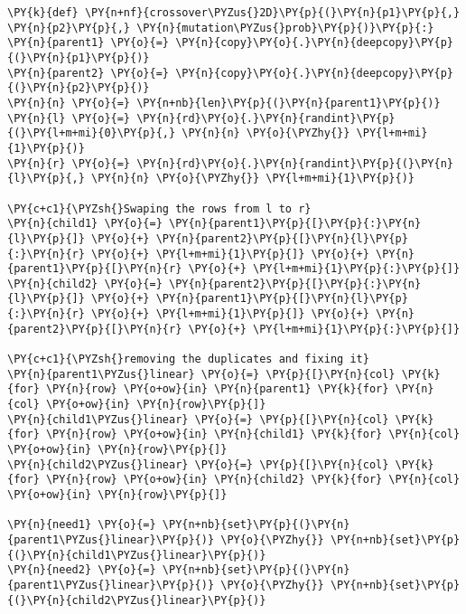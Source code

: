 \begin{tcolorbox}[breakable, size=fbox, boxrule=1pt, pad at break*=1mm,colback=cellbackground, colframe=cellborder]
\begin{Verbatim}[commandchars=\\\{\}]
\PY{k}{def} \PY{n+nf}{crossover\PYZus{}2D}\PY{p}{(}\PY{n}{p1}\PY{p}{,} \PY{n}{p2}\PY{p}{,} \PY{n}{mutation\PYZus{}prob}\PY{p}{)}\PY{p}{:}
\PY{n}{parent1} \PY{o}{=} \PY{n}{copy}\PY{o}{.}\PY{n}{deepcopy}\PY{p}{(}\PY{n}{p1}\PY{p}{)}
\PY{n}{parent2} \PY{o}{=} \PY{n}{copy}\PY{o}{.}\PY{n}{deepcopy}\PY{p}{(}\PY{n}{p2}\PY{p}{)}
\PY{n}{n} \PY{o}{=} \PY{n+nb}{len}\PY{p}{(}\PY{n}{parent1}\PY{p}{)}
\PY{n}{l} \PY{o}{=} \PY{n}{rd}\PY{o}{.}\PY{n}{randint}\PY{p}{(}\PY{l+m+mi}{0}\PY{p}{,} \PY{n}{n} \PY{o}{\PYZhy{}} \PY{l+m+mi}{1}\PY{p}{)}
\PY{n}{r} \PY{o}{=} \PY{n}{rd}\PY{o}{.}\PY{n}{randint}\PY{p}{(}\PY{n}{l}\PY{p}{,} \PY{n}{n} \PY{o}{\PYZhy{}} \PY{l+m+mi}{1}\PY{p}{)}

\PY{c+c1}{\PYZsh{}Swaping the rows from l to r}
\PY{n}{child1} \PY{o}{=} \PY{n}{parent1}\PY{p}{[}\PY{p}{:}\PY{n}{l}\PY{p}{]} \PY{o}{+} \PY{n}{parent2}\PY{p}{[}\PY{n}{l}\PY{p}{:}\PY{n}{r} \PY{o}{+} \PY{l+m+mi}{1}\PY{p}{]} \PY{o}{+} \PY{n}{parent1}\PY{p}{[}\PY{n}{r} \PY{o}{+} \PY{l+m+mi}{1}\PY{p}{:}\PY{p}{]}
\PY{n}{child2} \PY{o}{=} \PY{n}{parent2}\PY{p}{[}\PY{p}{:}\PY{n}{l}\PY{p}{]} \PY{o}{+} \PY{n}{parent1}\PY{p}{[}\PY{n}{l}\PY{p}{:}\PY{n}{r} \PY{o}{+} \PY{l+m+mi}{1}\PY{p}{]} \PY{o}{+} \PY{n}{parent2}\PY{p}{[}\PY{n}{r} \PY{o}{+} \PY{l+m+mi}{1}\PY{p}{:}\PY{p}{]}

\PY{c+c1}{\PYZsh{}removing the duplicates and fixing it}
\PY{n}{parent1\PYZus{}linear} \PY{o}{=} \PY{p}{[}\PY{n}{col} \PY{k}{for} \PY{n}{row} \PY{o+ow}{in} \PY{n}{parent1} \PY{k}{for} \PY{n}{col} \PY{o+ow}{in} \PY{n}{row}\PY{p}{]}
\PY{n}{child1\PYZus{}linear} \PY{o}{=} \PY{p}{[}\PY{n}{col} \PY{k}{for} \PY{n}{row} \PY{o+ow}{in} \PY{n}{child1} \PY{k}{for} \PY{n}{col} \PY{o+ow}{in} \PY{n}{row}\PY{p}{]}
\PY{n}{child2\PYZus{}linear} \PY{o}{=} \PY{p}{[}\PY{n}{col} \PY{k}{for} \PY{n}{row} \PY{o+ow}{in} \PY{n}{child2} \PY{k}{for} \PY{n}{col} \PY{o+ow}{in} \PY{n}{row}\PY{p}{]}

\PY{n}{need1} \PY{o}{=} \PY{n+nb}{set}\PY{p}{(}\PY{n}{parent1\PYZus{}linear}\PY{p}{)} \PY{o}{\PYZhy{}} \PY{n+nb}{set}\PY{p}{(}\PY{n}{child1\PYZus{}linear}\PY{p}{)}
\PY{n}{need2} \PY{o}{=} \PY{n+nb}{set}\PY{p}{(}\PY{n}{parent1\PYZus{}linear}\PY{p}{)} \PY{o}{\PYZhy{}} \PY{n+nb}{set}\PY{p}{(}\PY{n}{child2\PYZus{}linear}\PY{p}{)}


\end{Verbatim}
\end{tcolorbox}
